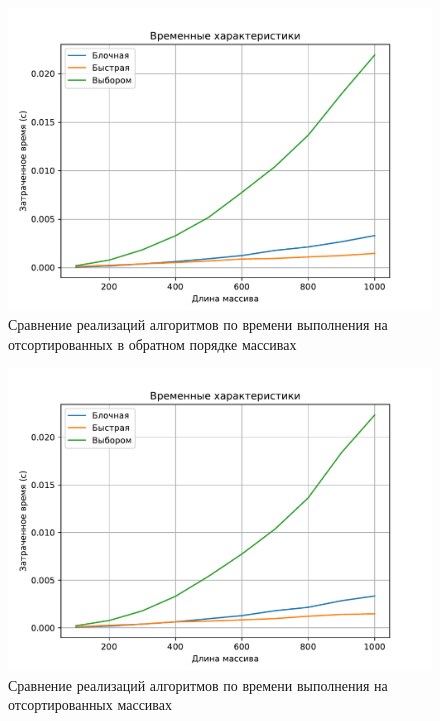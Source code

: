 \newpage

\begin{figure}[H]
	\centering
	\includegraphics[scale=0.62]{assets/plots/cpu-reversed.pdf}
	\caption{Сравнение реализаций алгоритмов по времени выполнения на отсортированных в обратном порядке массивах}
	\label{pic:reversed}
\end{figure}

\newpage

\begin{figure}[H]
	\centering
	\includegraphics[scale=0.62]{assets/plots/cpu-sorted.pdf}
	\caption{Сравнение реализаций алгоритмов по времени выполнения на отсортированных массивах}
	\label{pic:sorted}
\end{figure}

\clearpage

